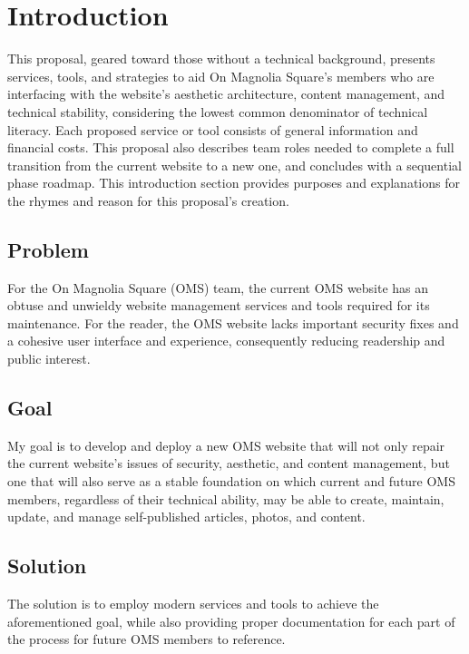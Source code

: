 \section{Introduction}
This proposal, geared toward those without a technical background, presents services, tools, and strategies to aid On Magnolia Square's members who are interfacing with the website's aesthetic architecture, content management, and technical stability, considering the lowest common denominator of technical literacy. Each proposed service or tool consists of general information and financial costs. This proposal also describes team roles needed to complete a full transition from the current website to a new one, and concludes with a sequential phase roadmap. This introduction section provides purposes and explanations for the rhymes and reason for this proposal's creation.

\subsection{Problem}
For the On Magnolia Square (OMS) team, the current OMS website has an obtuse and unwieldy website management services and tools required for its maintenance. For the reader, the OMS website lacks important security fixes and a cohesive user interface and experience, consequently reducing readership and public interest.

\subsection{Goal}
My goal is to develop and deploy a new OMS website that will not only repair the current website's issues of security, aesthetic, and content management, but one that will also serve as a stable foundation on which current and future OMS members, regardless of their technical ability, may be able to create, maintain, update, and manage self-published articles, photos, and content.

\subsection{Solution}
The solution is to employ modern services and tools to achieve the aforementioned goal, while also providing proper documentation for each part of the process for future OMS members to reference.

